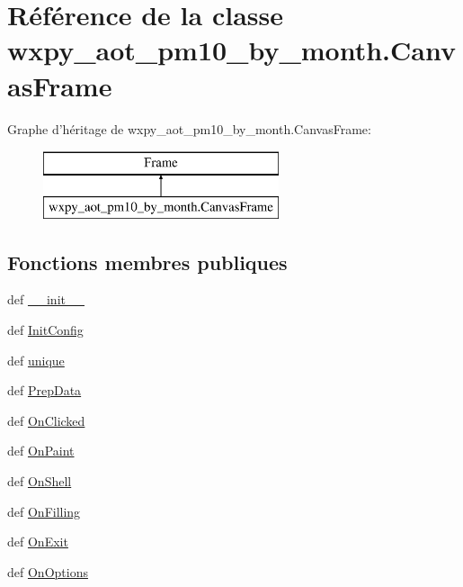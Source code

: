 \hypertarget{classwxpy__aot__pm10__by__month_1_1_canvas_frame}{\section{Référence de la classe wxpy\-\_\-aot\-\_\-pm10\-\_\-by\-\_\-month.\-Canvas\-Frame}
\label{classwxpy__aot__pm10__by__month_1_1_canvas_frame}
}
Graphe d'héritage de wxpy\-\_\-aot\-\_\-pm10\-\_\-by\-\_\-month.\-Canvas\-Frame\-:\begin{figure}[H]
\begin{center}
\leavevmode
\includegraphics[height=2.000000cm]{classwxpy__aot__pm10__by__month_1_1_canvas_frame}
\end{center}
\end{figure}
\subsection*{Fonctions membres publiques}
\begin{DoxyCompactItemize}
\item 
def \hyperlink{classwxpy__aot__pm10__by__month_1_1_canvas_frame_a4de434fce1ba37499ae84d037c1c04d7}{\-\_\-\-\_\-init\-\_\-\-\_\-}
\item 
def \hyperlink{classwxpy__aot__pm10__by__month_1_1_canvas_frame_aecde9ea7e79178d7251a8ccfe771c25b}{Init\-Config}
\item 
def \hyperlink{classwxpy__aot__pm10__by__month_1_1_canvas_frame_a21fa0cfb666b8a2a8dad95a35fd05763}{unique}
\item 
def \hyperlink{classwxpy__aot__pm10__by__month_1_1_canvas_frame_acf3c1646918d532c1111be746de67029}{Prep\-Data}
\item 
def \hyperlink{classwxpy__aot__pm10__by__month_1_1_canvas_frame_ad95ddd57324d6de92c07a78dd02f08c0}{On\-Clicked}
\item 
def \hyperlink{classwxpy__aot__pm10__by__month_1_1_canvas_frame_a55dd7fc797814490cac2b8b484b91cd3}{On\-Paint}
\item 
def \hyperlink{classwxpy__aot__pm10__by__month_1_1_canvas_frame_a7a3d7557e440227e826e058e24a7dc34}{On\-Shell}
\item 
def \hyperlink{classwxpy__aot__pm10__by__month_1_1_canvas_frame_ae31f79a0d1731b8708bd3102598866f0}{On\-Filling}
\item 
def \hyperlink{classwxpy__aot__pm10__by__month_1_1_canvas_frame_af38f509f594e96042dd95bf948918633}{On\-Exit}
\item 
def \hyperlink{classwxpy__aot__pm10__by__month_1_1_canvas_frame_ab6d9e7f0f13c4fadaafb01d081e99a46}{On\-Options}
\end{DoxyCompactItemize}
